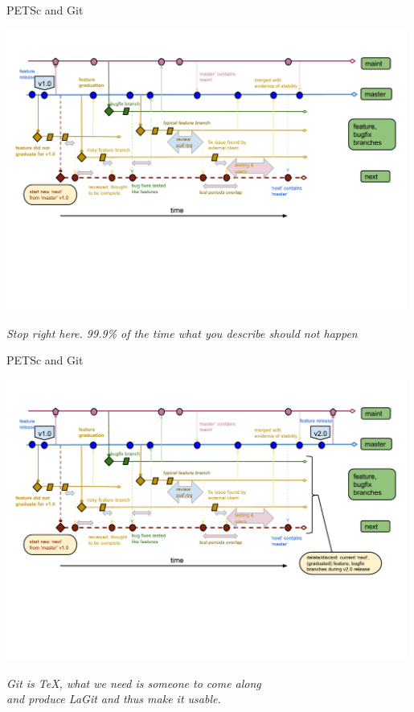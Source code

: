 \begin{frame}{PETSc and Git}
  \begin{center}
    \includegraphics[width=0.99\textwidth]{figures/gitworkflows-85}
  \end{center}
  \begin{flushright} \vspace*{-0.5cm}
   \textit{Stop right here. 99.9\% of the time what you describe should not happen}
  \end{flushright}
\end{frame}

\begin{frame}{PETSc and Git}
  \begin{center}
    \includegraphics[width=0.99\textwidth]{figures/gitworkflows-90}
  \end{center}
  \begin{flushright} \vspace*{-0.8cm}
   \textit{Git is TeX, what we need is someone to come along\\ and produce LaGit and thus make it usable.}
  \end{flushright}
\end{frame}

